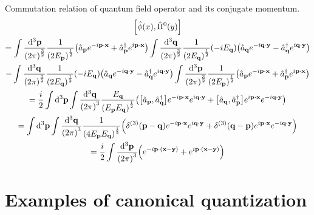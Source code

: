 \documentclass{report}
\begin{document}
\begin{subquests}
	\item Commutation relation of quantum field operator and its conjugate momentum. 
	\begin{gather*}
		\bqty{\hat{\phi}(x),\hat{\Pi}^0(y)} \\
		= \int \frac{\dd^3{\vb p}}{\pqty{2\pi}^{\frac{3}{2}}}\frac{1}{\pqty{2E_{\vb p}}^{\frac{1}{2}}}\pqty{\hat{a}_{\vb p}e^{-i\vb p\cdot \vb x} + \hat{a}^{\dagger}_{\vb p}e^{i\vb p\cdot \vb x}}\int \frac{\dd^3{\vb q}}{\pqty{2\pi}^{\frac{3}{2}}}\frac{1}{\pqty{2E_{\vb q}}^{\frac{1}{2}}}\pqty{-iE_{\vb q}}\pqty{\hat{a}_{\vb q}e^{-i\vb q\cdot \vb y} - \hat{a}^{\dagger}_{\vb q}e^{i\vb q\cdot \vb y}} \\
		-\int \frac{\dd^3{\vb q}}{\pqty{2\pi}^{\frac{3}{2}}}\frac{1}{\pqty{2E_{\vb q}}^{\frac{1}{2}}}\pqty{-iE_{\vb q}}\pqty{\hat{a}_{\vb q}e^{-i\vb q\cdot \vb y} - \hat{a}^{\dagger}_{\vb q}e^{i\vb q\cdot \vb y}}\int \frac{\dd^3{\vb p}}{\pqty{2\pi}^{\frac{3}{2}}}\frac{1}{\pqty{2E_{\vb p}}^{\frac{1}{2}}}\pqty{\hat{a}_{\vb p}e^{-i\vb p\cdot \vb x} + \hat{a}^{\dagger}_{\vb p}e^{i\vb p\cdot \vb x}} \\
		= \frac{i}{2}\int \dd^3{\vb p}\int \frac{\dd^3{\vb q}}{\pqty{2\pi}^3}\frac{E_{\vb q}}{\pqty{E_{\vb p}E_{\vb q}}^{\frac{1}{2}}}\pqty{\bqty{\hat{a}_{\vb p},\hat{a}^{\dagger}_{\vb q}}e^{-i\vb p\cdot \vb x}e^{i\vb q\cdot \vb y} + \bqty{\hat{a}_{\vb q},\hat{a}^{\dagger}_{\vb p}}e^{i\vb p\cdot \vb x}e^{-i\vb q\cdot \vb y}} \\
		= \int \dd^3{\vb p}\int \frac{\dd^3{\vb q}}{\pqty{2\pi}^3}\frac{1}{\pqty{4E_{\vb p}E_{\vb q}}^{\frac{1}{2}}}\pqty{\delta^{(3)}\pqty{\vb p - \vb q}e^{-i\vb p\cdot \vb x}e^{i\vb q\cdot \vb y} + \delta^{(3)}\pqty{\vb q - \vb p}e^{i\vb p\cdot \vb x}e^{-i\vb q\cdot \vb y}} \\
		= \frac{i}{2}\int\frac{\dd^3{\vb p}}{\pqty{2\pi}^3}\pqty{e^{-i\vb p\cdot(\vb x - \vb y)} + e^{i\vb p\cdot(\vb x - \vb y)}}
	\end{gather*}
\end{subquests}

\chapter{Examples of canonical quantization}
\end{document}
